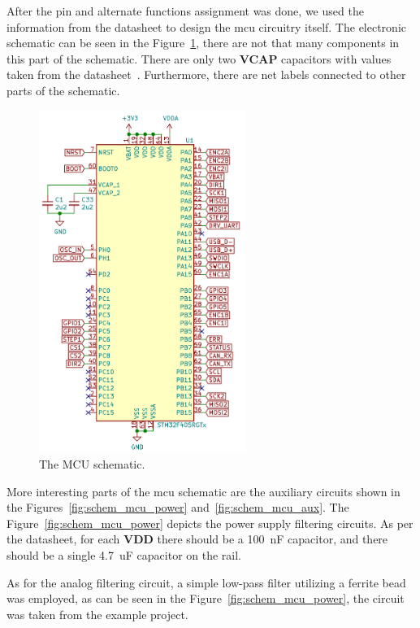 After the pin and alternate functions assignment was done, we used the information from the datasheet to design the \acs{mcu} circuitry itself.
The electronic schematic can be seen in the Figure~\ref{fig:schem_mcu}, there are not that many components in this part of the schematic.
There are only two \textbf{VCAP} capacitors with values taken from the datasheet~\cite{stmicro_stm32f405xx_2020}.
Furthermore, there are net labels connected to other parts of the schematic.

\begin{figure}[H]
    \centering
    \includegraphics[width=0.6\textwidth]{obrazky/schem_mcu}
    \caption{The MCU schematic.}
    \label{fig:schem_mcu}
\end{figure}

More interesting parts of the \acs{mcu} schematic are the auxiliary circuits shown in the Figures~\ref{fig:schem_mcu_power} and~\ref{fig:schem_mcu_aux}.
The Figure~\ref{fig:schem_mcu_power} depicts the power supply filtering circuits.
As per the datasheet\cite{stmicro_stm32f405xx_2020}, for each \textbf{VDD} there should be a 100~nF capacitor, and there should be a single 4.7~uF capacitor on the rail.

As for the analog filtering circuit, a simple low-pass filter utilizing a ferrite bead was employed, as can be seen in the Figure~\ref{fig:schem_mcu_power}, the circuit was taken from the example project\cite{salmony_kicad_2020}.

